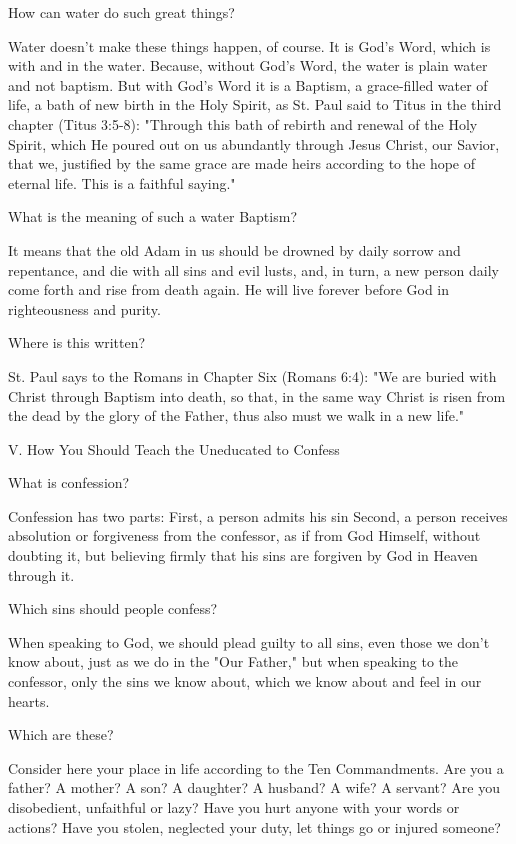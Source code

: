 How can water do such great things?

Water doesn't make these things happen, of course. It is God's Word,
which is with and in the water. Because, without God's Word, the water
is plain water and not baptism. But with God's Word it is a Baptism, a
grace-filled water of life, a bath of new birth in the Holy Spirit, as
St. Paul said to Titus in the third chapter (Titus 3:5-8):
"Through this bath of rebirth and renewal of the Holy Spirit, which He
poured out on us abundantly through Jesus Christ, our Savior, that we,
justified by the same grace are made heirs according to the hope of
eternal life. This is a faithful saying."

What is the meaning of such a water Baptism?

It means that the old Adam in us should be drowned by daily sorrow and
repentance, and die with all sins and evil lusts, and, in turn, a new
person daily come forth and rise from death again. He will live forever
before God in righteousness and purity.

Where is this written?

St. Paul says to the Romans in Chapter Six (Romans 6:4):
"We are buried with Christ through Baptism into death, so that, in the
same way Christ is risen from the dead by the glory of the Father, thus
also must we walk in a new life."

V. How You Should Teach the Uneducated to Confess

What is confession?

Confession has two parts: First, a person admits his sin Second, a
person receives absolution or forgiveness from the confessor, as if
from God Himself, without doubting it, but believing firmly that his
sins are forgiven by God in Heaven through it.

Which sins should people confess?

When speaking to God, we should plead guilty to all sins, even those we
don't know about, just as we do in the "Our Father," but when speaking
to the confessor, only the sins we know about, which we know about and
feel in our hearts.

Which are these?

Consider here your place in life according to the Ten Commandments. Are
you a father? A mother? A son? A daughter? A husband? A wife? A
servant? Are you disobedient, unfaithful or lazy? Have you hurt anyone
with your words or actions? Have you stolen, neglected your duty, let
things go or injured someone?

